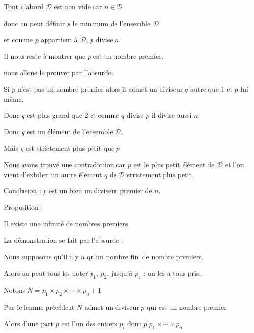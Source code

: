 \change

Tout d'abord $\mathcal{D}$ est non vide car $n \in \mathcal{D}$

\change

donc on peut définir $p$ le minimum de l'ensemble $\mathcal{D}$

et comme $p$ appartient à $\mathcal{D}$, $p$ divise $n$.

\change 

Il nous reste à montrer que $p$ est un nombre premier,


\change

nous allons le prouver par l'absurde.

Si $p$ n'est pas un nombre premier  
alors il admet un diviseur $q$ autre que $1$ et $p$ lui-même.

\change

Donc $q$ est plus grand que $2$ et comme $q$ divise $p$ il divise aussi $n$.

Donc $q$ est un élément de l'ensemble $\mathcal{D}$.

Mais $q$ est strictement plus petit que $p$

\change

Nous avons trouvé une contradiction car $p$ est le plus petit élément de $\mathcal{D}$
et l'on vient d'exhiber un autre élément $q$ de $\mathcal{D}$ strictement plus petit.

Conclusion : $p$ est un bien un diviseur premier de $n$.



\diapo

Proposition :

Il existe une infinité de nombres premiers

\change

La démonstration se fait par l'absurde .

Nous supposons qu'il n'y a qu'un nombre fini de nombre premiers.

\change

Alors on peut tous les noter $p_1$, $p_2$, jusqu'à $p_n$ : on les a tous pris.

\change

Notons  $N=p_1\times p_2\times \cdots \times p_n+ 1$

Par le lemme précédent $N$ admet un diviseur $p$ qui est un nombre premier

\change

Alors d'une part $p$ est l'un des entiers $p_i$
donc $p | p_1\times \cdots \times p_n$

